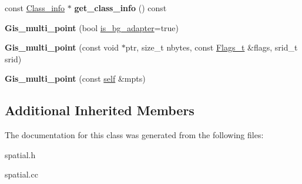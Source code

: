 \begin{DoxyCompactItemize}
\mbox{\label{classGis__multi__point_ab28194ea629aa0345dbf4ef895e27667}} 
const \mbox{\hyperlink{classGeometry_1_1Class__info}{Class\+\_\+info}} $\ast$ {\bfseries get\+\_\+class\+\_\+info} () const
\item 
\mbox{\label{classGis__multi__point_a555a9ff39ab0af624de46cdbfcfb0aff}} 
{\bfseries Gis\+\_\+multi\+\_\+point} (bool \mbox{\hyperlink{classGeometry_ada614004627a9e7af129e51a34242af9}{is\+\_\+bg\+\_\+adapter}}=true)
\item 
\mbox{\label{classGis__multi__point_a297bb64167714a04d93e3ae1f5184ee2}} 
{\bfseries Gis\+\_\+multi\+\_\+point} (const void $\ast$ptr, size\+\_\+t nbytes, const \mbox{\hyperlink{classGeometry_1_1Flags__t}{Flags\+\_\+t}} \&flags, srid\+\_\+t srid)
\item 
\mbox{\label{classGis__multi__point_aa516587fb7addd9b7a39858284f5cfd4}} 
{\bfseries Gis\+\_\+multi\+\_\+point} (const \mbox{\hyperlink{classGis__multi__point}{self}} \&mpts)
\end{DoxyCompactItemize}
\subsection*{Additional Inherited Members}


The documentation for this class was generated from the following files\+:\begin{DoxyCompactItemize}
\item 
spatial.\+h\item 
spatial.\+cc\end{DoxyCompactItemize}
